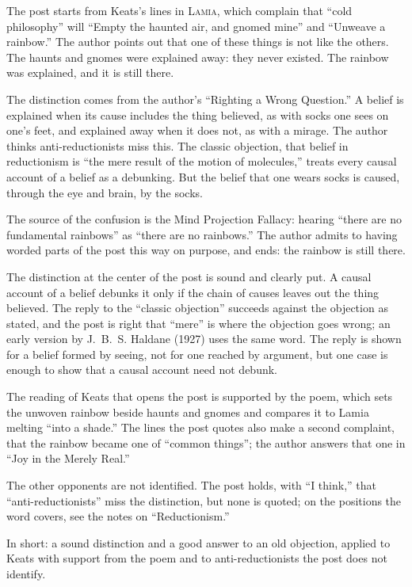\begin{afterword}
\summaryhead

The post starts from Keats's lines in \textsc{Lamia}, which complain that ``cold philosophy'' will ``Empty the haunted air, and gnomed mine'' and ``Unweave a rainbow.'' The author points out that one of these things is not like the others. The haunts and gnomes were explained away: they never existed. The rainbow was explained, and it is still there.

The distinction comes from the author's ``Righting a Wrong Question.'' A belief is explained when its cause includes the thing believed, as with socks one sees on one's feet, and explained away when it does not, as with a mirage. The author thinks anti-reductionists miss this. The classic objection, that belief in reductionism is ``the mere result of the motion of molecules,'' treats every causal account of a belief as a debunking. But the belief that one wears socks is caused, through the eye and brain, by the socks.

The source of the confusion is the Mind Projection Fallacy: hearing ``there are no fundamental rainbows'' as ``there are no rainbows.'' The author admits to having worded parts of the post this way on purpose, and ends: the rainbow is still there.

\responsehead

The distinction at the center of the post is sound and clearly put. A causal account of a belief debunks it only if the chain of causes leaves out the thing believed. The reply to the ``classic objection'' succeeds against the objection as stated, and the post is right that ``mere'' is where the objection goes wrong; an early version by J.~B.~S. Haldane (1927) uses the same word. The reply is shown for a belief formed by seeing, not for one reached by argument, but one case is enough to show that a causal account need not debunk.

The reading of Keats that opens the post is supported by the poem, which sets the unwoven rainbow beside haunts and gnomes and compares it to Lamia melting ``into a shade.'' The lines the post quotes also make a second complaint, that the rainbow became one of ``common things''; the author answers that one in ``Joy in the Merely Real.''

The other opponents are not identified. The post holds, with ``I think,'' that ``anti-reductionists'' miss the distinction, but none is quoted; on the positions the word covers, see the notes on ``Reductionism.''

In short: a sound distinction and a good answer to an old objection, applied to Keats with support from the poem and to anti-reductionists the post does not identify.
\end{afterword}
